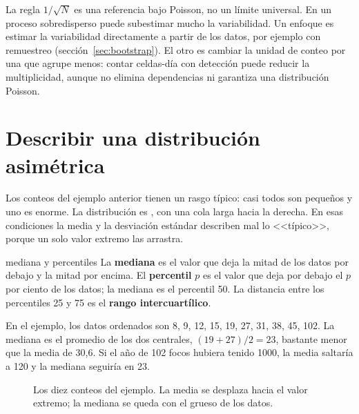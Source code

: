 La regla $1/\sqrt{N}$ es una referencia bajo Poisson, no un límite universal. En un
proceso sobredisperso puede subestimar mucho la variabilidad. Un enfoque es estimar la
variabilidad directamente a partir de los datos, por ejemplo con remuestreo
(sección~\ref{sec:bootstrap}). El otro es cambiar la unidad de conteo por una que agrupe menos:
contar celdas-día con detección puede reducir la multiplicidad, aunque no elimina
dependencias ni garantiza una distribución Poisson.

\section{Describir una distribución asimétrica}

Los conteos del ejemplo anterior tienen un rasgo típico: casi todos son pequeños y uno es
enorme. La distribución es , con una cola larga hacia la derecha. En esas
condiciones la media y la desviación estándar describen mal lo <<típico>>, porque un solo valor
extremo las arrastra.

\begin{definicion}{mediana y percentiles}
La \textbf{mediana} es el valor que deja la mitad de los datos por debajo y la mitad por encima.
El \textbf{percentil} $p$ es el valor que deja por debajo el $p$ por ciento de los datos; la
mediana es el percentil 50. La distancia entre los percentiles 25 y 75 es el \textbf{rango
intercuartílico}.
\end{definicion}

En el ejemplo, los datos ordenados son 8, 9, 12, 15, 19, 27, 31, 38, 45, 102. La mediana es el
promedio de los dos centrales, $(19+27)/2 = 23$, bastante menor que la media de 30,6. Si el año
de 102 focos hubiera tenido 1000, la media saltaría a 120 y la mediana seguiría en 23.

\begin{figure}[ht]
\centering
{}
\caption{Los diez conteos del ejemplo. La media se desplaza hacia el valor extremo; la mediana
se queda con el grueso de los datos.}
\label{fig:mediana}
\end{figure}

